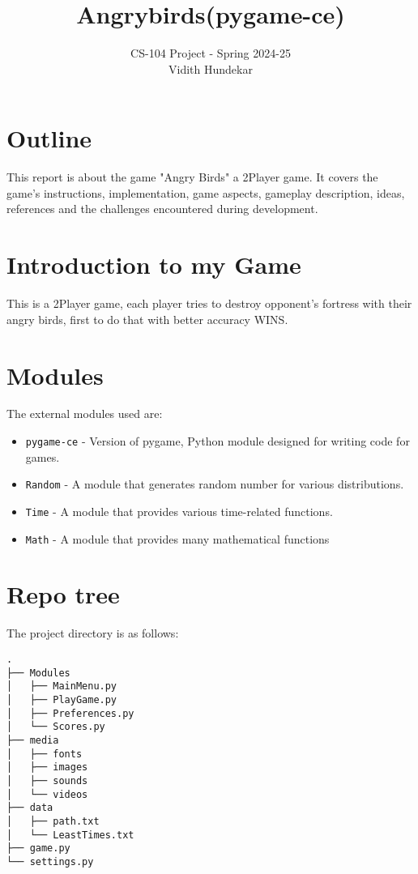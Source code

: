 \documentclass{article}
\title{Angrybirds(pygame-ce)}
\author{CS-104 Project - Spring 2024-25 \\ Vidith Hundekar}
\date{}
\begin{document}
\maketitle

\section*{Outline}
This report is about the game "Angry Birds" a 2Player game. It covers the game's instructions, implementation, game aspects, gameplay description, ideas, references and the challenges encountered during development.

\tableofcontents

\section{Introduction to my Game}
This is a 2Player game, each player tries to destroy opponent's fortress with their angry birds, first to do that with better accuracy WINS.

\section{Modules}
The external modules used are:

\begin{itemize}
    \item \texttt{pygame-ce} - Version of pygame, Python module designed for writing code for games.
    \item \texttt{Random} - A module that generates random number for various distributions.
    \item \texttt{Time} - A module that provides various time-related functions.
    \item \texttt{Math} - A module that provides many mathematical functions
\end{itemize}

\section{Repo tree}
The project directory is as follows:

\begin{lstlisting}
.
├── Modules
│   ├── MainMenu.py
│   ├── PlayGame.py
│   ├── Preferences.py
│   └── Scores.py
├── media
│   ├── fonts
│   ├── images
│   ├── sounds
│   └── videos
├── data
│   ├── path.txt
│   └── LeastTimes.txt
├── game.py
└── settings.py
\end{lstlisting}
\end{document}
